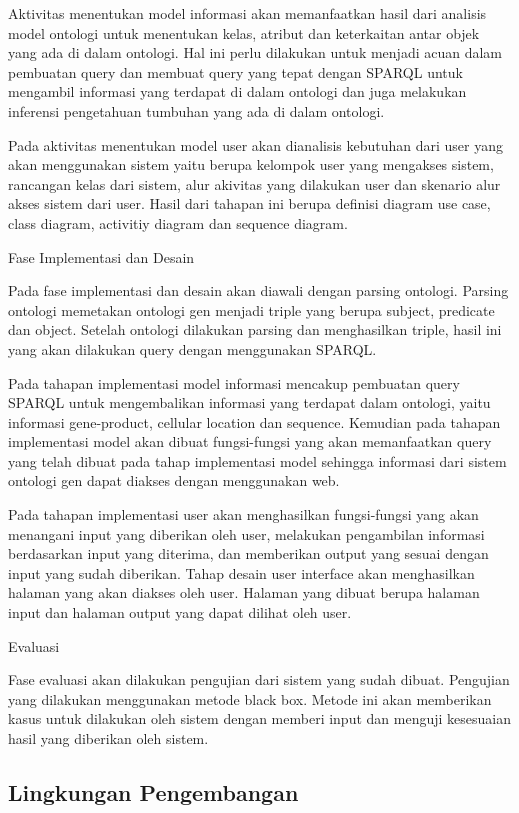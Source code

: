 Aktivitas menentukan model informasi akan memanfaatkan hasil dari analisis model ontologi untuk menentukan kelas, atribut dan keterkaitan antar objek yang ada di dalam ontologi. Hal ini perlu dilakukan untuk menjadi acuan dalam pembuatan query dan membuat query yang tepat dengan SPARQL untuk mengambil informasi yang terdapat di dalam ontologi dan juga melakukan inferensi pengetahuan tumbuhan yang ada di dalam ontologi. 

Pada aktivitas menentukan model user akan dianalisis kebutuhan dari user yang akan menggunakan sistem yaitu berupa kelompok user yang mengakses sistem, rancangan kelas dari sistem, alur akivitas yang dilakukan user dan skenario alur akses sistem dari user. Hasil dari tahapan ini berupa definisi diagram use case, class diagram, activitiy diagram dan sequence diagram.

Fase Implementasi dan Desain

Pada fase implementasi dan desain akan diawali dengan parsing ontologi. Parsing ontologi memetakan ontologi gen menjadi triple yang berupa subject, predicate dan object. Setelah ontologi dilakukan parsing dan menghasilkan triple, hasil ini yang akan dilakukan query dengan menggunakan SPARQL.

Pada tahapan implementasi model informasi mencakup pembuatan query SPARQL untuk mengembalikan informasi yang terdapat dalam ontologi, yaitu informasi gene-product, cellular location dan sequence. Kemudian pada tahapan implementasi model akan dibuat fungsi-fungsi yang akan memanfaatkan query yang telah dibuat pada tahap implementasi model sehingga informasi dari sistem ontologi gen dapat diakses dengan menggunakan web. 

Pada tahapan implementasi user akan menghasilkan fungsi-fungsi yang akan menangani input yang diberikan oleh user, melakukan pengambilan informasi berdasarkan input yang diterima, dan memberikan output yang sesuai dengan input yang sudah diberikan. Tahap desain user interface akan menghasilkan halaman yang akan diakses oleh user. Halaman yang dibuat berupa halaman input dan halaman output yang dapat dilihat oleh user.

Evaluasi

Fase evaluasi akan dilakukan pengujian dari sistem yang sudah dibuat. Pengujian yang dilakukan  menggunakan metode black box. Metode ini akan memberikan kasus untuk dilakukan oleh sistem dengan memberi input dan menguji kesesuaian hasil yang diberikan oleh sistem.

\subsection*{Lingkungan Pengembangan}

